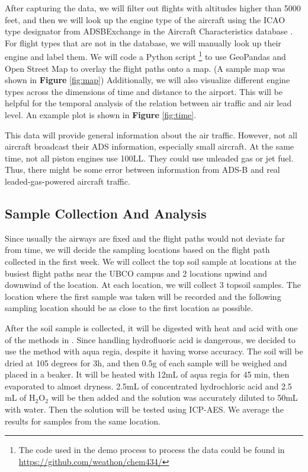 \documentclass[12pt]{article}
\begin{document}
After capturing the data, we will filter out flights with altitudes higher than 5000 feet, and then we will look up the engine type of the aircraft using the ICAO type designator from ADSBExchange in the Aircraft Characteristics database \supercite{faa}. For flight types that are not in the database, we will manually look up their engine and label them. We will code a Python script \footnote{The code used in the demo process to process the data could be found in \url{https://github.com/weathon/chem434/}} to use GeoPandas and Open Street Map \supercite{OpenStreetMap} to overlay the flight paths onto a map. (A sample map was shown in \textbf{Figure} \ref{fig:map}) Additionally, we will also visualize different engine types across the dimensions of time and distance to the airport. This will be helpful for the temporal analysis of the relation between air traffic and air lead level. An example plot is shown in \textbf{Figure} \ref{fig:time}.


This data will provide general information about the air traffic. However, not all aircraft broadcast their ADS information, especially small aircraft. At the same time, not all piston engines use 100LL. They could use unleaded gas or jet fuel. Thus, there might be some error between information from ADS-B and real leaded-gas-powered aircraft traffic. 

\subsection{Sample Collection And Analysis}
Since usually the airways are fixed and the flight paths would not deviate far from time, we will decide the sampling locations based on the flight path collected in the first week. We will collect the top soil sample at locations at the busiest flight paths near the UBCO campus and 2 locations upwind and downwind of the location. At each location, we will collect 3 topsoil samples. The location where the first sample was taken will be recorded and the following sampling location should be as close to the first location as possible. 

After the soil sample is collected, it will be digested with heat and acid with one of the methods in  \supercite{moor_determination_2001}. Since handling hydrofluoric acid is dangerous, we decided to use the method with aqua regia, despite it having worse accuracy. The soil will be dried at 105 degrees for 3h, and then 0.5g of each sample will be weighed and placed in a beaker. It will be heated with 12mL of aqua regia for 45 min, then evaporated to almost dryness. 2.5mL of concentrated hydrochloric acid and 2.5 mL of H$_2$O$_2$ will be then added and the solution was accurately diluted to 50mL with water. \supercite{moor_determination_2001} Then the solution will be tested using ICP-AES. We average the results for samples from the same location. 
\end{document}
